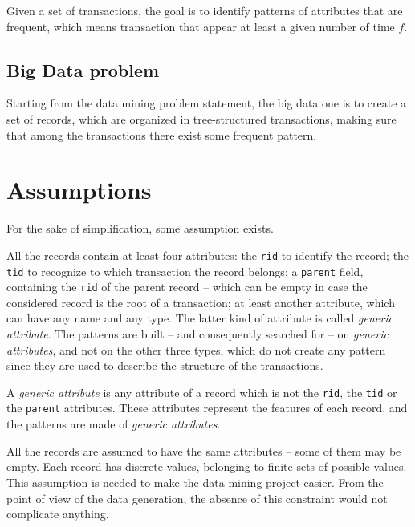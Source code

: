 \documentclass{acm_proc_article-sp-sigmod09}
\begin{document}
Given a set of transactions, the goal is to identify patterns of attributes that are frequent, which means transaction that appear at least a given number of time $f$.

\subsection{Big Data problem}
Starting from the data mining problem statement, the big data one is to create a set of records, which are organized in tree-structured transactions, making sure that among the transactions there exist some frequent pattern.

\section{Assumptions}
\label{sec:assumptions}
For the sake of simplification, some assumption exists.

All the records contain at least four attributes: the \texttt{rid} to identify the record; the \texttt{tid} to recognize to which transaction the record belongs; a \texttt{parent} field, containing the \texttt{rid} of the parent record -- which can be empty in case the considered record is the root of a transaction; at least another attribute, which can have any name and any type. The latter kind of attribute is called \emph{generic attribute}. The patterns are built -- and consequently searched for -- on \emph{generic attributes}, and not on the other three types, which do not create any pattern since they are used to describe the structure of the transactions.

\begin{definition}
A \emph{generic attribute} is any attribute of a record which is not the \texttt{rid}, the \texttt{tid} or the \texttt{parent} attributes. These attributes represent the features of each record, and the patterns are made of \emph{generic attributes}.
\end{definition}

All the records are assumed to have the same attributes -- some of them may be empty. Each record has discrete values, belonging to finite sets of possible values. This assumption is needed to make the data mining project easier. From the point of view of the data generation, the absence of this constraint would not complicate anything.
\end{document}
